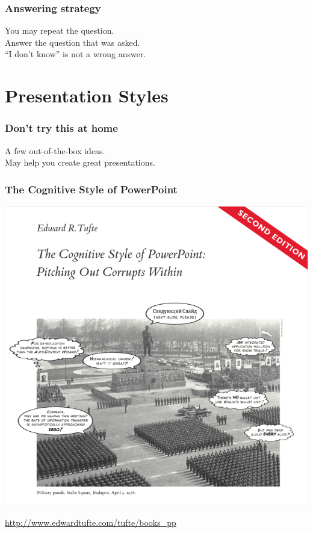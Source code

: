 \documentclass{beamer}
\begin{document}
\begin{frame}

\frametitle{Answering strategy}

\Large
You may repeat the question.\\[1em]

Answer the question that was asked.\\[1em]

``I don't know'' is not a wrong answer.\\[1em]

\end{frame}

\section{Presentation Styles}

\begin{frame}
\frametitle{Don't try this at home}

\Large
A few out-of-the-box ideas.\\[1em]

May help you create great presentations.

\end{frame}

\begin{frame}
\frametitle{The Cognitive Style of PowerPoint}

\begin{center}
\includegraphics[height=0.8\textheight]{book_pp_cover}

\url{http://www.edwardtufte.com/tufte/books_pp}
\end{center}

\end{frame}
\end{document}
